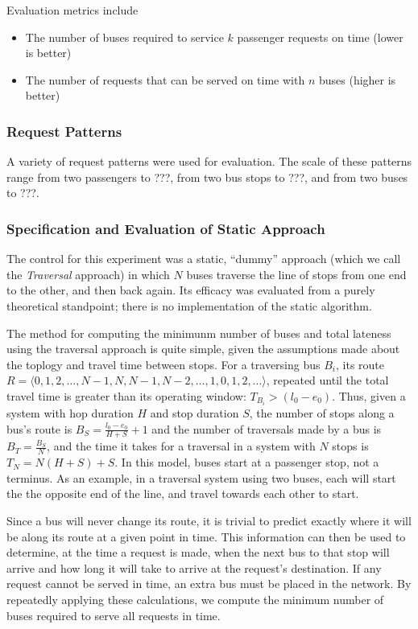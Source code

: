 \documentclass[runningheads]{llncs}
\begin{document}
Evaluation metrics include
\begin{itemize}
	\item The number of buses required to service $k$ passenger requests on time (lower is better)
	\item The number of requests that can be served on time with $n$ buses (higher is better)
\end{itemize}

\subsubsection{Request Patterns}
A variety of request patterns were used for evaluation. The scale of these patterns range from two passengers to ???, from two bus stops to ???, and from two buses to ???.

\subsubsection{Specification and Evaluation of Static Approach}
The control for this experiment was a static, ``dummy'' approach (which we call the \emph{Traversal} approach) in which $N$ buses traverse the line of stops from one end to the other, and then back again. Its efficacy was evaluated from a purely theoretical standpoint; there is no implementation of the static algorithm.

The method for computing the minimunm number of buses and total lateness using the traversal approach is quite simple, given the assumptions made about the toplogy and travel time between stops. For a traversing bus $B_i$, its route $R = \langle 0, 1, 2, \dots, N-1, N, N-1, N-2, \dots, 1, 0, 1, 2, \dots \rangle$, repeated until the total travel time is greater than its operating window: $T_{B_i} > (l_0 - e_0)$. Thus, given a system with hop duration $H$ and stop duration $S$, the number of stops along a bus's route is $B_S = \frac{l_0 - e_0}{H + S} + 1$ and the number of traversals made by a bus is $B_T = \frac{B_S}{N}$, and the time it takes for a traversal in a system with $N$ stops is $T_N = N (H + S) + S$. In this model, buses start at a passenger stop, not a terminus. As an example, in a traversal system using two buses, each will start the the opposite end of the line, and travel towards each other to start.

Since a bus will never change its route, it is trivial to predict exactly where it will be along its route at a given point in time. This information can then be used to determine, at the time a request is made, when the next bus to that stop will arrive and how long it will take to arrive at the request's destination. If any request cannot be served in time, an extra bus must be placed in the network. By repeatedly applying these calculations, we compute the minimum number of buses required to serve all requests in time.
\end{document}
